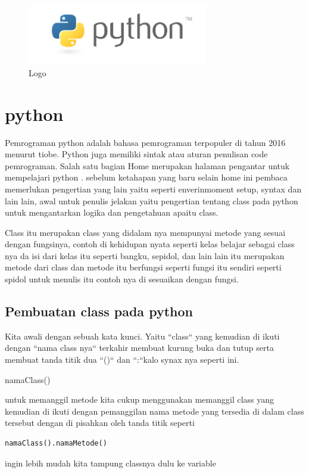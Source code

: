 
\sloppy

\begin{figure}[ht]
	\centerline{\includegraphics[width=0.70\textwidth]{figures/python}}
	\caption{Logo}
	\label{Logo}
\end{figure}

\section{python}
Pemrograman python adalah bahasa pemrograman terpopuler di tahun 2016 menurut tiobe. Python juga memiliki sintak atau aturan penulisan code pemrograman. Salah satu bagian Home merupakan halaman pengantar untuk mempelajari python . sebelum ketahapan yang baru selain home ini pembaca memerlukan pengertian yang lain yaitu seperti enverinmoment setup, syntax dan lain lain, awal untuk penulis jelakan yaitu pengertian tentang class pada python untuk mengantarkan logika dan pengetahuan apaitu class.

Class itu merupakan class yang didalam nya mempunyai metode yang sesuai dengan fungsinya, contoh di kehidupan nyata seperti kelas belajar sebagai class nya da isi dari kelas itu seperti bangku, sepidol, dan lain lain itu merupakan metode dari class dan metode itu berfungsi seperti fungsi itu sendiri seperti spidol untuk menulis itu contoh nya di sesuaikan dengan fungsi.
\subsection{Pembuatan class pada python}
Kita awali dengan sebuah kata kunci. Yaitu  ``class`` yang kemudian di ikuti dengan  ``nama class nya`` terkahir membuat kurung buka dan tutup serta membuat tanda titik dua  ``()`` dan ``:``kalo synax nya seperti ini.

namaClass()

untuk memanggil metode kita cukup menggunakan memanggil class yang kemudian di ikuti dengan pemanggilan nama metode yang tersedia di dalam class tersebut dengan di pisahkan oleh tanda titik seperti 
\begin{verbatim}
namaClass().namaMetode()
\end{verbatim}
ingin lebih mudah kita tampung classnya dulu ke variable 

